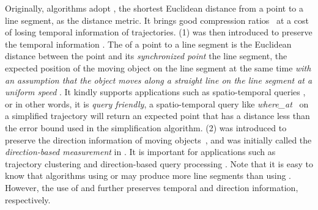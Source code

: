 Originally, \lsa algorithms adopt \ped, {the shortest Euclidean distance from a point to a line segment, as the distance metric. It brings good compression ratios~\cite{Douglas:Peucker, Hershberger:Speeding, Liu:BQS, Muckell:Compression, Chen:Trajectory, Cao:Spatio, Shi:Survey} at a cost of losing temporal information of trajectories.}
{(1) \sed was then introduced to preserve the temporal information \cite{Meratnia:Spatiotemporal,Cao:Spatio}.
The \sed of a point to a line segment is the Euclidean distance between the point and its \emph{synchronized point} \wrt the line segment, the expected position of the moving object on the line segment at the same time \emph{with an assumption that the object moves along a straight line on the line segment at a uniform speed} \cite{Cao:Spatio}. It kindly supports applications such as spatio-temporal queries \cite{Meratnia:Spatiotemporal,Lin:Cised}, or in other words, it is \emph{query friendly}, \ie a spatio-temporal query like \emph{where\_at}~\cite{Cao:Spatio} on a simplified trajectory will return an expected point that has a distance less than the error bound used in the simplification algorithm.}
(2) \dad was introduced to preserve the direction information of moving objects~\cite{Long:Direction, Zhang:Evaluation}, and was initially called the \emph{direction-based measurement} in \cite{Long:Direction}. It is important for applications such as trajectory clustering and direction-based query processing \cite{Long:Direction,Long:Mining}.
%
Note that it is easy to know that \lsa algorithms using \sed or \dad may produce more line segments than using \ped. However, the use of \sed and \dad further preserves temporal and direction information, respectively.



